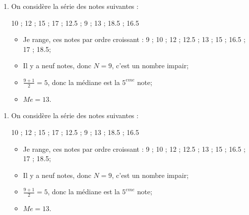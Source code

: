 \documentclass[12pt,a4paper]{article}
\begin{document}
\begin{myexs}
	\begin{enumerate}
		\item On considère la série des notes suivantes : 
		
		\num{10} ; \num{12} ; \num{15} ; \num{17} ; \num{12.5} ; \num{9} ; \num{13} ; \num{18.5} ; \num{16.5}
		
		\begin{itemize}
			\item Je range, ces notes par ordre croissant :
			\num{9} ; \num{10} ; \num{12} ; \num{12.5} ; \num{13} ; \num{15} ; \num{16.5} ; \num{17} ; \num{18.5};
			
			\item Il y a neuf notes, donc $N = 9$, c'est un nombre impair;
			\item $\frac{9+1}{2} = 5$, donc la médiane est la $5^{eme}$ note;
			\item $Me = 13$.
		\end{itemize}
		
	\end{enumerate}
\end{myexs}

\begin{myexs}
	\begin{enumerate}
		\item On considère la série des notes suivantes : 
		
		\num{10} ; \num{12} ; \num{15} ; \num{17} ; \num{12.5} ; \num{9} ; \num{13} ; \num{18.5} ; \num{16.5}
		
		\begin{itemize}
			\item Je range, ces notes par ordre croissant :
			\num{9} ; \num{10} ; \num{12} ; \num{12.5} ; \num{13} ; \num{15} ; \num{16.5} ; \num{17} ; \num{18.5};
			
			\item Il y a neuf notes, donc $N = 9$, c'est un nombre impair;
			\item $\frac{9+1}{2} = 5$, donc la médiane est la $5^{eme}$ note;
			\item $Me = 13$.
		\end{itemize}
		
	\end{enumerate}
\end{myexs}
\end{document}
